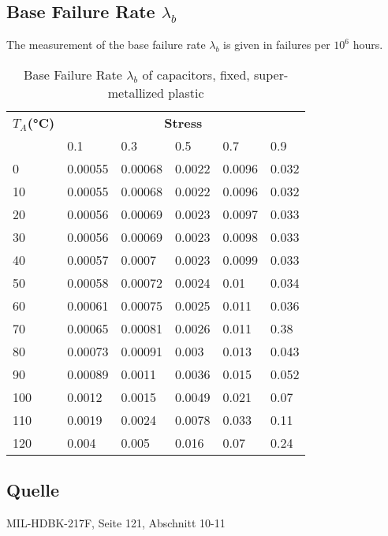 \subsection{Base Failure Rate $\lambda_b$}
The measurement of the base failure rate $\lambda_b$ is given in failures per $10^6$ hours.
\begin{table}[ht]
{\centering

\begin{tabular}{|p{1.05cm}|*{5}{p{1.2cm}|}}
    \hline
    \textbf{$T_A$(°C)} & \multicolumn{5}{c|}{\textbf{Stress}} \\
    & 0.1 & 0.3 & 0.5 & 0.7 & 0.9 \\
    \hline
    0 & 0.00055 & 0.00068 & 0.0022 & 0.0096 & 0.032 \\
    \hline
    10 & 0.00055 & 0.00068 & 0.0022 & 0.0096 & 0.032 \\
    \hline
    20 & 0.00056 & 0.00069 & 0.0023 & 0.0097 & 0.033 \\
    \hline
    30 & 0.00056 & 0.00069 & 0.0023 & 0.0098 & 0.033 \\
    \hline
    40 & 0.00057 & 0.0007 & 0.0023 & 0.0099 & 0.033 \\
    \hline
    50 & 0.00058 & 0.00072 & 0.0024 & 0.01 & 0.034 \\
    \hline
    60 & 0.00061 & 0.00075 & 0.0025 & 0.011 & 0.036 \\
    \hline
    70 & 0.00065 & 0.00081 & 0.0026 & 0.011 & 0.38 \\
    \hline
    80 & 0.00073 & 0.00091 & 0.003 & 0.013 & 0.043 \\
    \hline
    90 & 0.00089 & 0.0011 & 0.0036 & 0.015 & 0.052 \\
    \hline
    100 & 0.0012 & 0.0015 & 0.0049 & 0.021 & 0.07 \\
    \hline
    110 & 0.0019 & 0.0024 & 0.0078 & 0.033 & 0.11 \\
    \hline
    120 & 0.004 & 0.005 & 0.016 & 0.07 & 0.24 \\
    \hline
\end{tabular}
\caption{Base Failure Rate $\lambda_b$ of capacitors, fixed, super-metallized plastic}
\label{tab:bfr_capacitors_fixed_super-metallized_plastic}
\par}
\subsection*{Quelle}
MIL-HDBK-217F, Seite 121, Abschnitt 10-11
\end{table}